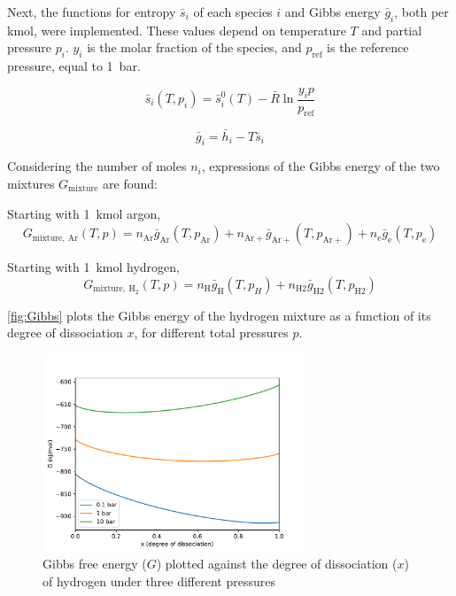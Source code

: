         Next, the functions for entropy $\bar s_i$ of each species $i$ and Gibbs energy $\bar g_i$, both per \unit{kmol}, were implemented. These values depend on temperature $T$ and partial pressure $p_i$. $y_i$ is the molar fraction of the species, and $p_\mathrm{ref}$ is the reference pressure, equal to \qty{1}{bar}.
        
        \begin{equation}
            \bar s_i (T, p_i) = \bar s_i^0 (T) - \bar R \ln \frac{y_i p}{p_\mathrm{ref}}
        \end{equation}

        \begin{equation}
            \bar g_i = \bar h_i - T \bar s_i
        \end{equation}

        Considering the number of moles $n_i$, expressions of the Gibbs energy of the two mixtures $G_\mathrm{mixture}$ are found:

        Starting with \qty{1}{kmol} argon,
        \begin{equation}
            G_\mathrm{mixture,\: Ar}(T, p) = n_\mathrm{Ar} \bar g_\mathrm{Ar}(T, p_\mathrm{Ar}) + n_\mathrm{Ar+} \bar g_\mathrm{Ar+}(T, p_\mathrm{Ar+}) + n_\mathrm{e} \bar g_\mathrm{e}(T, p_\mathrm{e})
        \end{equation}

        Starting with \qty{1}{kmol} hydrogen,
        \begin{equation}
            G_\mathrm{mixture,\: H_2}(T, p) = n_\mathrm{H} \bar g_\mathrm{H}(T, p_H) + n_\mathrm{H2} \bar g_\mathrm{H2}(T, p_\mathrm{H2})
        \end{equation}

        \autoref{fig:Gibbs} plots the Gibbs energy of the hydrogen mixture as a function of its degree of dissociation $x$, for different total pressures $p$.

        \begin{figure}[!ht]
            \centering
            \includegraphics[width=0.7\textwidth]{assets/2 models/Gibbs.pdf}
            \caption{Gibbs free energy ($G$) plotted against the degree of dissociation ($x$) of hydrogen under three different pressures}
            \label{fig:Gibbs}
        \end{figure}

